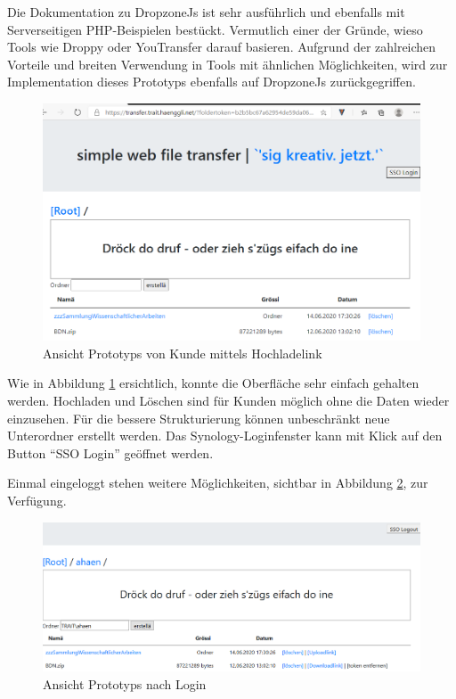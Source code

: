 \clearpage
Die Dokumentation \cite{DropzoneJs} zu DropzoneJs ist sehr ausführlich und ebenfalls mit Serverseitigen PHP-Beispielen bestückt. 
Vermutlich einer der Gründe, wieso Tools wie Droppy oder YouTransfer darauf basieren.
Aufgrund der zahlreichen Vorteile und breiten Verwendung in Tools mit ähnlichen Möglichkeiten,
wird zur Implementation dieses Prototyps ebenfalls auf DropzoneJs zurückgegriffen.

\begin{figure}[!h]
    \centering
    \includegraphics[width=1\linewidth]{content/images/prototyp_nichteingeloggt.png}
    \caption{Ansicht Prototyps von Kunde mittels Hochladelink}
    \label{fig:Prototyp_Hochladelink}
\end{figure} %
Wie in Abbildung \ref{fig:Prototyp_Hochladelink} ersichtlich, konnte die Oberfläche sehr einfach gehalten werden.
Hochladen und Löschen sind für Kunden möglich ohne die Daten wieder einzusehen. Für die bessere Strukturierung können unbeschränkt neue Unterordner erstellt werden.
Das Synology-Loginfenster kann mit Klick auf den Button ``SSO Login'' geöffnet werden. \\ 
    
\clearpage  

Einmal eingeloggt stehen weitere Möglichkeiten, sichtbar in Abbildung \ref{fig:Prototyp_Migrator}, zur Verfügung. 

\begin{figure}[!h]
    \centering
    \includegraphics[width=1\linewidth]{content/images/prototyp_eingeloggt.png}
    \caption{Ansicht Prototyps nach Login}
    \label{fig:Prototyp_Migrator}
\end{figure}

